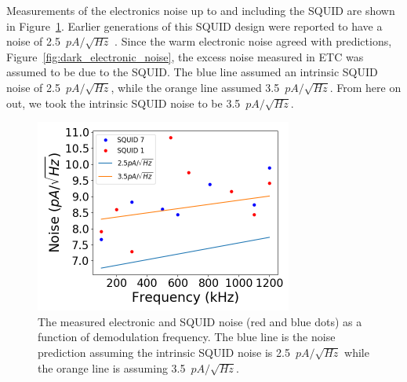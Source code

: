 Measurements of the electronics noise up to and including the \ac{SQUID} are shown in Figure~\ref{fig:adjust_squid}.
Earlier generations of this \ac{SQUID} design were reported to have a noise of 2.5~$pA/\sqrt{Hz}$ \cite{Huber2001}.
Since the warm electronic noise agreed with predictions, Figure~\ref{fig:dark_electronic_noise}, the excess noise measured in \ac{ETC} was assumed to be due to the \ac{SQUID}. 
The blue line assumed an intrinsic \ac{SQUID} noise of 2.5~$pA/\sqrt{Hz}$, while the orange line assumed 3.5~$pA/\sqrt{Hz}$.
From here on out, we took the intrinsic \ac{SQUID} noise to be 3.5~$pA/\sqrt{Hz}$.

\begin{figure}[ht!]
\begin{center}
\includegraphics[height=2.5in]{figures/adjusting_squid_noise.png}
\caption{The measured electronic and \ac{SQUID} noise (red and blue dots) as a function of demodulation frequency. The blue line is the noise prediction assuming the intrinsic \ac{SQUID} noise is 2.5~$pA/\sqrt{Hz}$ while the orange line is assuming 3.5~$pA/\sqrt{Hz}$.  
\label{fig:adjust_squid} }
\end{center}
\end{figure}







